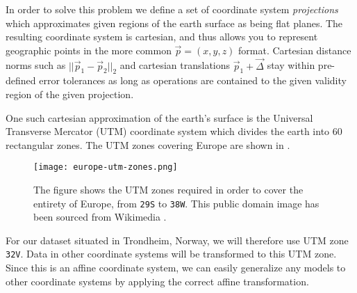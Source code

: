 In order to solve this problem we define a set of coordinate system \textit{projections} which approximates given regions of the earth surface as being flat planes.
The resulting coordinate system is cartesian, and thus allows you to represent geographic points in the more common $\vec{p} = (x, y, z)$ format.
Cartesian distance norms such as $||\vec{p}_1 - \vec{p}_2||_2$ and cartesian translations $\vec{p}_1 + \vec{\Delta}$ stay within pre-defined error tolerances as long as operations are contained to the given validity region of the given projection.

One such cartesian approximation of the earth's surface is the Universal Transverse Mercator (UTM) coordinate system which divides the earth into 60 rectangular zones. The UTM zones covering Europe are shown in .

\begin{figure}[H]
  \centering
  \texttt{[image: europe-utm-zones.png]}
  \caption{
    The figure shows the UTM zones required in order to cover the entirety of Europe, from \texttt{29S} to \texttt{38W}.
    This public domain image has been sourced from Wikimedia \cite{wiki:europe_utm_zones}.
  }
  \label{fig:europe-utm-zones}
\end{figure}

For our dataset situated in Trondheim, Norway, we will therefore use UTM zone \texttt{32V}.
Data in other coordinate systems will be transformed to this UTM zone.
Since this is an affine coordinate system, we can easily generalize any models to other coordinate systems by applying the correct affine transformation.
